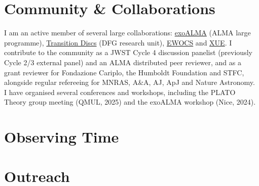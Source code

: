 \documentclass[12pt,a4paper, colorlinks = true,
            linkcolor = blue,
            urlcolor  = blue,
            citecolor = blue,
            anchorcolor = blue]{moderncv}
\begin{document}
\vspace{-3pt}
\section{Community \& Collaborations}
I am an active member of several large collaborations: \href{https://www.exoalma.com/}{exoALMA} (ALMA large programme), \href{https://www.transitiondiscs.com/}{Transition Discs} (DFG research unit), \href{https://westerlund1survey.wordpress.com}{EWOCS} and \href{https://www2.mpia-hd.mpg.de/homes/ramirez/XUE_MCRT.html}{XUE}. I contribute to the community as a JWST Cycle 4 discussion panelist (previously Cycle 2/3 external panel) and an ALMA distributed peer reviewer, and as a grant reviewer for Fondazione Cariplo, the Humboldt Foundation and STFC, alongside regular refereeing for MNRAS, A\&A, AJ, ApJ and Nature Astronomy. I have organised several conferences and workshops, including the PLATO Theory group meeting (QMUL, 2025) and the exoALMA workshop (Nice, 2024).

\vspace{-3pt}
\section{Observing Time}

\vspace{-12pt}
\section{Outreach}
\end{document}
